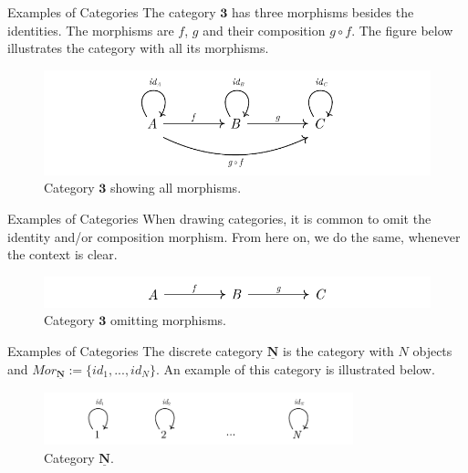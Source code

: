 \documentclass[aspectratio=169,xcolor=dvipsnames,10pt]{beamer}
\begin{document}
\begin{frame}[fragile]{Examples of Categories}
	The category $\bm 3$ has three morphisms besides the identities. The morphisms are
	$f$, $g$ and their composition $g \circ f$. The figure below
	illustrates the category with all its morphisms.
	\bigskip
	\begin{figure}[H]
		\begin{center}
			\includegraphics[width=1.00\textwidth]{./figs/3Cat.pdf}
		\end{center}
		\caption{Category $\bm 3$ showing all morphisms.}
		\label{fig:3Catcomplete}
	\end{figure}
\end{frame}

\begin{frame}[fragile]{Examples of Categories}
    When drawing categories, it is common to omit
    the identity and/or composition morphism. From here on,
    we do the same, whenever the context is clear.
	\bigskip
	\begin{figure}[H]
		\begin{center}
			\includegraphics[width=1.00\textwidth]{../notebooks/3Catsimple.pdf}
		\end{center}
		\caption{Category $\bm 3$ omitting morphisms.}
		\label{fig:3Catcomplete}
	\end{figure}
\end{frame}

\begin{frame}[fragile]{Examples of Categories}
	The discrete category $\mathbf{\underline{N}}$ is the category with $N$ objects
	and $Mor_{\mathbf{\underline{N}}} := \{id_1,...,id_N\}$. An example of this category is
	illustrated below.
	\bigskip
	\begin{figure}[H]
		\begin{center}
			\includegraphics[width=0.80\textwidth]{../notebooks/DiscreteCategory.pdf}
		\end{center}
        \caption{Category $\mathbf{\underline{N}}$.}
		\label{fig:3Catcomplete}
	\end{figure}
\end{frame}
\end{document}
